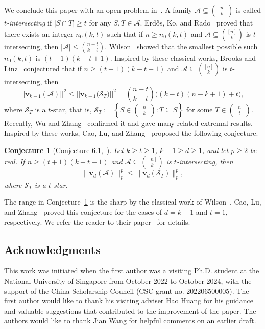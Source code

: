 \documentclass[11pt]{article}
\numberwithin{equation}{section}
\newtheorem{conjecture}[theorem]{Conjecture}
\def\A{\mathcal{A}}
\begin{document}
We conclude this paper with an open problem in~\cite{Cao}.
A family  $\A \subseteq \binom{[n]}{k}$ is called {\em $t$-intersecting} if $|S\cap T|\geq t$ for any $S,T\in \A$.
Erd\H{o}s, Ko, and Rado~\cite{Erdos} proved that
there exists an integer $n_0(k, t)$ such that
if $n\geq n_0(k, t)$ and $\A \subseteq \binom{[n]}{k}$ is $t$-intersecting, then
$|\A| \leq \binom{n-t}{k-t}.$
Wilson~\cite{Wilson} showed that the smallest possible such $n_0(k, t)$ is $(t+1)(k-t+1)$.
Inspired by these classical works,
Brooks and Linz~\cite[Conjecture 4.1]{Brooks} conjectured that
if $n\geq (t+1)(k-t+1)$ and
$\mathcal{A} \subseteq \binom{[n]}{k}$ is $t$-intersecting,
then
$$||\mathbf{v}_{k-1}(\A)||^2\leq ||\mathbf{v}_{k-1}\big(\mathcal{S}_T\big)||^2
=\binom{n-t}{k-t}\big( (k-t)(n-k+1)+t\big),$$
where $\mathcal{S}_T$ is a $t$-star, that is,
$\mathcal{S}_T:=
\left\{S\in\binom{[n]}k: T\subseteq S\right\}$ for some $T\in\binom{[n]}{t}$.
Recently, Wu and Zhang~\cite{Wu} confirmed it and gave many related extremal results.
Inspired by these works, Cao, Lu, and Zhang~\cite{Cao} proposed the following conjecture.


\begin{conjecture}[Conjecture 6.1,~\cite{Cao}]\label{Caoconj}
Let $k\geq t\geq 1$, $k-1\geq d\geq 1$, and let $p\geq2$ be real.
If $n\geq(t+1)(k-t+1)$ and $\A\subseteq\binom{[n]}k$ is $t$-intersecting, then
\[
 \|\mathbf{v}_d(\A)\|_p^p \leq \|\mathbf{v}_d(\mathcal{S}_T)\|_p^p,
\]
where $\mathcal{S}_T$ is a $t$-star.
\end{conjecture}

The range in Conjecture~\ref{Caoconj} is the sharp by the classical work of Wilson~\cite{Wilson}.
Cao, Lu, and Zhang~\cite{Cao} proved this conjecture for the cases of $d=k-1$ and $t=1$, respectively.
We refer the reader to their paper~\cite{Cao} for details.



\subsection*{Acknowledgments}
This work was initiated when the first author was a visiting Ph.D. student at the National University of Singapore
from October 2022 to October 2024,
with the support of the China Scholarship Council (CSC grant no. 202206500005).
The first author would like to thank
his visiting adviser Hao Huang for his guidance and valuable suggestions that contributed to the improvement of the paper.
The authors would like to thank Jian Wang for helpful comments on an earlier draft.
\end{document}
